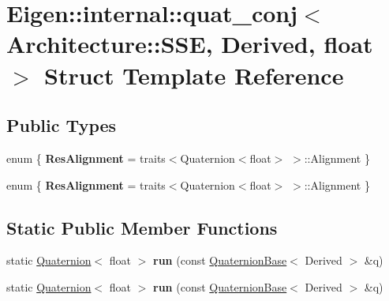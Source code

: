 \hypertarget{struct_eigen_1_1internal_1_1quat__conj_3_01_architecture_1_1_s_s_e_00_01_derived_00_01float_01_4}{}\section{Eigen\+:\+:internal\+:\+:quat\+\_\+conj$<$ Architecture\+:\+:S\+SE, Derived, float $>$ Struct Template Reference}
\label{struct_eigen_1_1internal_1_1quat__conj_3_01_architecture_1_1_s_s_e_00_01_derived_00_01float_01_4}
\subsection*{Public Types}
\begin{DoxyCompactItemize}
\item 
\mbox{\label{struct_eigen_1_1internal_1_1quat__conj_3_01_architecture_1_1_s_s_e_00_01_derived_00_01float_01_4_aeca8c4d4f15153456c4f08f4a11817a6}} 
enum \{ {\bfseries Res\+Alignment} = traits$<$Quaternion$<$float$>$ $>$\+:\+:Alignment
 \}
\item 
\mbox{\label{struct_eigen_1_1internal_1_1quat__conj_3_01_architecture_1_1_s_s_e_00_01_derived_00_01float_01_4_a218c429cf108060f0aa1ff7f369d6e97}} 
enum \{ {\bfseries Res\+Alignment} = traits$<$Quaternion$<$float$>$ $>$\+:\+:Alignment
 \}
\end{DoxyCompactItemize}
\subsection*{Static Public Member Functions}
\begin{DoxyCompactItemize}
\item 
\mbox{\label{struct_eigen_1_1internal_1_1quat__conj_3_01_architecture_1_1_s_s_e_00_01_derived_00_01float_01_4_a34a5a10a0fc175f12721c10c2c0b8ec3}} 
static \hyperlink{group___geometry___module_class_eigen_1_1_quaternion}{Quaternion}$<$ float $>$ {\bfseries run} (const \hyperlink{group___geometry___module_class_eigen_1_1_quaternion_base}{Quaternion\+Base}$<$ Derived $>$ \&q)
\item 
\mbox{\label{struct_eigen_1_1internal_1_1quat__conj_3_01_architecture_1_1_s_s_e_00_01_derived_00_01float_01_4_a34a5a10a0fc175f12721c10c2c0b8ec3}} 
static \hyperlink{group___geometry___module_class_eigen_1_1_quaternion}{Quaternion}$<$ float $>$ {\bfseries run} (const \hyperlink{group___geometry___module_class_eigen_1_1_quaternion_base}{Quaternion\+Base}$<$ Derived $>$ \&q)
\end{DoxyCompactItemize}


